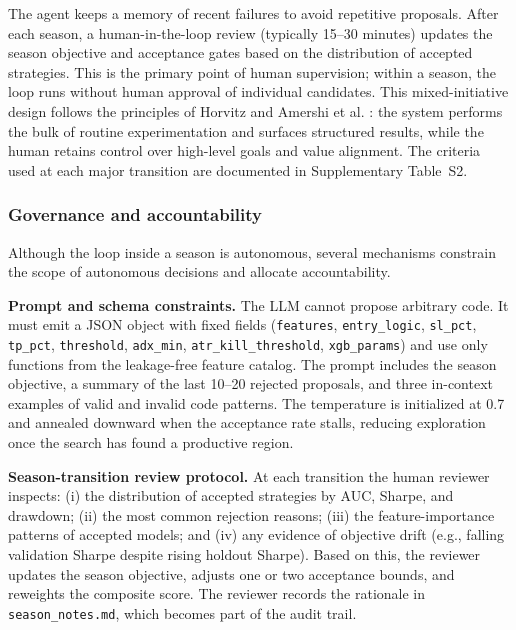 \documentclass[11pt,a4paper]{article}
\begin{document}
The agent keeps a memory of recent failures to avoid repetitive proposals. After each season, a human-in-the-loop review (typically 15--30 minutes) updates the season objective and acceptance gates based on the distribution of accepted strategies. This is the primary point of human supervision; within a season, the loop runs without human approval of individual candidates. This mixed-initiative design follows the principles of Horvitz \citep{horvitz_1999} and Amershi et al. \citep{amershi_2019}: the system performs the bulk of routine experimentation and surfaces structured results, while the human retains control over high-level goals and value alignment. The criteria used at each major transition are documented in Supplementary Table~S2.

\subsubsection{Governance and accountability}\label{governance-and-accountability}

Although the loop inside a season is autonomous, several mechanisms constrain the scope of autonomous decisions and allocate accountability.

\textbf{Prompt and schema constraints.} The LLM cannot propose arbitrary code. It must emit a JSON object with fixed fields (\texttt{features}, \texttt{entry\_logic}, \texttt{sl\_pct}, \texttt{tp\_pct}, \texttt{threshold}, \texttt{adx\_min}, \texttt{atr\_kill\_threshold}, \texttt{xgb\_params}) and use only functions from the leakage-free feature catalog. The prompt includes the season objective, a summary of the last 10--20 rejected proposals, and three in-context examples of valid and invalid code patterns. The temperature is initialized at 0.7 and annealed downward when the acceptance rate stalls, reducing exploration once the search has found a productive region.

\textbf{Season-transition review protocol.} At each transition the human reviewer inspects: (i) the distribution of accepted strategies by AUC, Sharpe, and drawdown; (ii) the most common rejection reasons; (iii) the feature-importance patterns of accepted models; and (iv) any evidence of objective drift (e.g., falling validation Sharpe despite rising holdout Sharpe). Based on this, the reviewer updates the season objective, adjusts one or two acceptance bounds, and reweights the composite score. The reviewer records the rationale in \texttt{season\_notes.md}, which becomes part of the audit trail.
\end{document}
